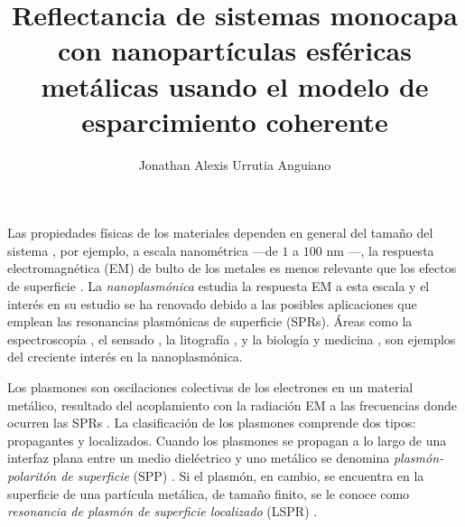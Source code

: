 \documentclass[letterpaper,11pt] {article}
\title{Reflectancia de sistemas monocapa con nanopartículas esféricas metálicas  usando el modelo de esparcimiento coherente }
\author{Jonathan Alexis Urrutia Anguiano}
\date{}
\begin{document}
\maketitle

Las propiedades f\'isicas de los materiales dependen en general del tamaño del sistema \cite{boverhof2015comparative}, por ejemplo, a escala nanom\'etrica ---de $1$ a $100$ nm \cite{boverhof2015comparative}---, la respuesta electromagn\'etica (EM) de bulto de los metales es menos relevante que los efectos de superficie \cite{zhao2008methods}.  La \emph{nanoplasm\'onica} estudia la respuesta EM a esta escala y el inter\'es en su estudio se ha renovado debido a las posibles aplicaciones que emplean las resonancias plasm\'onicas de superficie (SPRs).  Áreas como la espectroscop\'ia \cite{novotny2006principles}, el sensado \cite{jain2008noble}, la litograf\'ia \cite{stockman2011nanoplasmonics}, y la biolog\'ia y  medicina \cite{jain2008noble}, son ejemplos del creciente interés en la nanoplasmónica. 

Los plasmones son oscilaciones colectivas de los electrones en un material metálico,  resultado del  acoplamiento con la radiaci\'on EM a las frecuencias donde ocurren las SPRs \cite{stockman2011nanoplasmonics}.  La clasificación de los plasmones comprende  dos tipos: propagantes y localizados.  Cuando los plasmones se propagan a lo largo de una interfaz plana entre un medio diel\'ectrico y uno met\'alico se denomina  \emph{plasm\'on-polarit\'on de superficie} (SPP) \cite{maier2007plasmonics}.  Si el plasmón, en cambio, se encuentra en la superficie de una partícula  met\'alica, de tamaño finito, se le conoce como \emph{resonancia de plasm\'on de superficie localizado} (LSPR) \cite{maier2007plasmonics}. 
\end{document}
